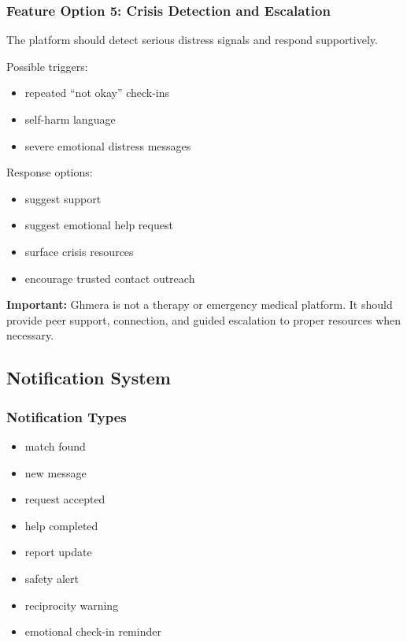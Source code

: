 \documentclass[11pt]{article}
\begin{document}
\subsubsection{Feature Option 5: Crisis Detection and Escalation}
The platform should detect serious distress signals and respond supportively.

Possible triggers:
\begin{itemize}[leftmargin=1.5em]
    \item repeated ``not okay'' check-ins
    \item self-harm language
    \item severe emotional distress messages
\end{itemize}

Response options:
\begin{itemize}[leftmargin=1.5em]
    \item suggest support
    \item suggest emotional help request
    \item surface crisis resources
    \item encourage trusted contact outreach
\end{itemize}

\textbf{Important:} Ghmera is not a therapy or emergency medical platform. It should provide peer support, connection, and guided escalation to proper resources when necessary.

\subsection{Notification System}

\subsubsection{Notification Types}
\begin{itemize}[leftmargin=1.5em]
    \item match found
    \item new message
    \item request accepted
    \item help completed
    \item report update
    \item safety alert
    \item reciprocity warning
    \item emotional check-in reminder
\end{itemize}
\end{document}

